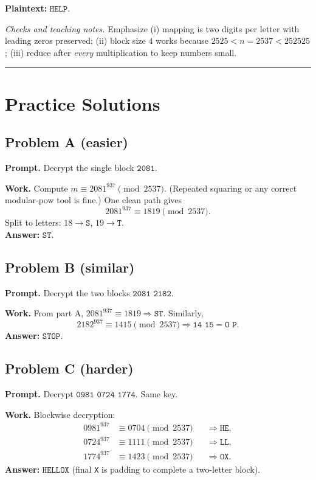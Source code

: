 \documentclass[12pt]{article}
\begin{document}
\textbf{Plaintext:} \(\boxed{\texttt{HELP}}\).

\medskip
\textit{Checks and teaching notes.} Emphasize (i) mapping is two digits per letter with leading zeros preserved; (ii) block size \(4\) works because \(2525<n=2537<252525\); (iii) reduce after \emph{every} multiplication to keep numbers small.

\hrule
\vspace{0.5em}

\section*{Practice Solutions}

\subsection*{Problem A (easier)}
\textbf{Prompt.} Decrypt the single block \(\texttt{2081}\).

\textbf{Work.} Compute \(m\equiv 2081^{937}\pmod{2537}\). (Repeated squaring or any correct modular-pow tool is fine.) One clean path gives
\[
2081^{937}\equiv \boxed{1819}\pmod{2537}.
\]
Split to letters: \(18\to \texttt{S}\), \(19\to \texttt{T}\). \\
\textbf{Answer:} \(\boxed{\texttt{ST}}\).

\subsection*{Problem B (similar)}
\textbf{Prompt.} Decrypt the two blocks \(\texttt{2081 2182}\).

\textbf{Work.} From part A, \(2081^{937}\equiv 1819\Rightarrow \texttt{ST}\).
Similarly,
\[
2182^{937}\equiv \boxed{1415}\pmod{2537}\Rightarrow \texttt{14 15}=\texttt{O P}.
\]
\textbf{Answer:} \(\boxed{\texttt{STOP}}\).

\subsection*{Problem C (harder)}
\textbf{Prompt.} Decrypt \(\texttt{0981 0724 1774}\). Same key.

\textbf{Work.} Blockwise decryption:
\[
\begin{aligned}
0981^{937}&\equiv \boxed{0704}\pmod{2537} &&\Rightarrow \texttt{HE},\\
0724^{937}&\equiv \boxed{1111}\pmod{2537} &&\Rightarrow \texttt{LL},\\
1774^{937}&\equiv \boxed{1423}\pmod{2537} &&\Rightarrow \texttt{OX}.
\end{aligned}
\]
\textbf{Answer:} \(\boxed{\texttt{HELLOX}}\) (final \texttt{X} is padding to complete a two-letter block).
\end{document}
